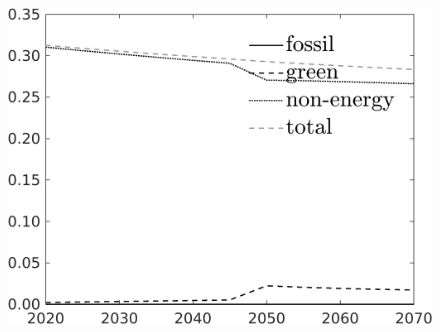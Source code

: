\begin{figure}[h!!]
\begin{minipage}[]{0.32\textwidth}
	\end{minipage}
	\begin{minipage}[]{0.32\textwidth}
		\includegraphics[width=1\textwidth]{../../codding_model/own_basedOnFried/optimalPol_010922_revision/figures/all_13Sept22_Tplus30/SingleJointTOT_regime0_OPT_T_NoTaus_Science_spillover0_knspil0_noskill0_sep0_xgrowth0_extern0_PV1_etaa0.79_lgd1.png}
	\end{minipage}
\end{figure} 



